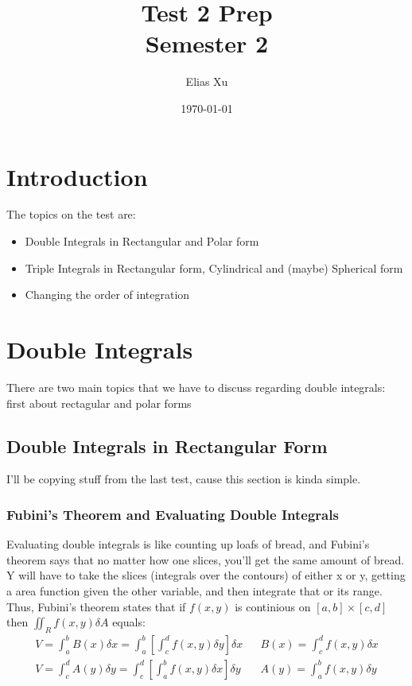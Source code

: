 \documentclass{article}
\begin{document}
\title{Test 2 Prep \\
    \large{Semester 2}}
\author{Elias Xu}
\date{\today}
\maketitle

\tableofcontents

\setlength{\parindent}{0pt}

\section{Introduction}

The topics on the test are: 
\begin{itemize}
    \item Double Integrals in Rectangular and Polar form
    \item Triple Integrals in Rectangular form, Cylindrical and (maybe) Spherical form
    \item Changing the order of integration
\end{itemize}

\section{Double Integrals}

There are two main topics that we have to discuss regarding double integrals: first about rectagular and polar forms

\subsection{Double Integrals in Rectangular Form}

I'll be copying stuff from the last test, cause this section is kinda simple. 


\subsubsection{Fubini's Theorem and Evaluating Double Integrals}

Evaluating double integrals is like counting up loafs of bread, and Fubini's theorem says that no matter how one slices, you'll get the same amount of bread. Y will have to take the slices (integrals over the contours) of either x or y, getting a area function given the other variable, and then integrate that or its range. \\ 
Thus, Fubini's theorem states that if $f(x, y)$ is continious on $[a, b] \times [c, d]$ then $\iint_{R} f(x, y) \delta A$ equals:
\begin{align*}
    V = \int_{a}^{b} B(x) \delta x = \int_{a}^{b} \left[ \int_{c}^{d} f(x,y) \delta y \right] \delta x  &  & B(x) = \int_{c}^{d} f(x, y) \delta x \\
    V = \int_{c}^{d} A(y) \delta y = \int_{c}^{d} \left[ \int_{a}^{b} f(x, y) \delta x \right] \delta y &  & A(y) = \int_{a}^{b} f(x, y) \delta y
\end{align*}
\end{document}
